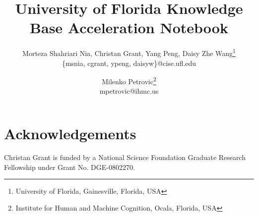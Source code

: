 \documentclass[10pt]{article}
\begin{document}
\title{University of Florida Knowledge Base Acceleration Notebook}





\author{Morteza Shahriari Nia, Christan Grant, Yang Peng, Daisy Zhe Wang\footnote{University of Florida, Gainesville, Florida, USA}\\
       {\{msnia, cgrant, ypeng, daisyw\}@cise.ufl.edu}
\and
  Milenko Petrovic\footnote{Institute for Human and Machine Cognition, Ocala, Florida, USA}\\
       {mpetrovic@ihmc.us}
}

 \date{}

\maketitle
















\section*{Acknowledgements}
Christan Grant is funded by a National Science Foundation Graduate Research
Fellowship under Grant No. DGE-0802270. 

%
%





\end{document}
